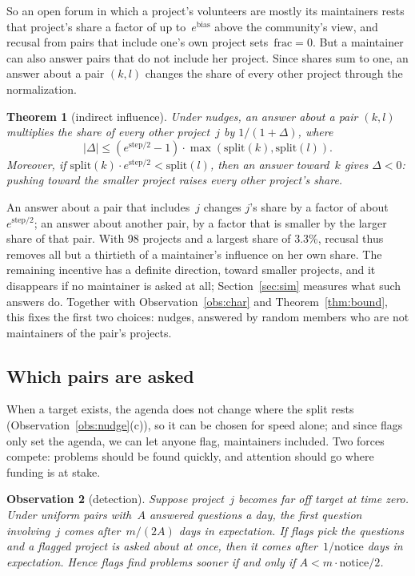 \documentclass[doubleblind]{ecai}
\newtheorem{theorem}{Theorem}
\newtheorem{observation}[theorem]{Observation}
\theoremstyle{remark}
\newcommand{\Split}{\mathrm{split}}
\newcommand{\step}{\mathrm{step}}
\newcommand{\notice}{\mathrm{notice}}
\newcommand{\bias}{\mathrm{bias}}
\newcommand{\frc}{\mathrm{frac}}
\begin{document}
So an open forum in which a project's volunteers are mostly its maintainers rests that project's share a factor of up to~$e^{\bias}$ above the community's view, and recusal from pairs that include one's own project sets~$\frc=0$. But a maintainer can also answer pairs that do not include her project. Since shares sum to one, an answer about a pair $(k,l)$ changes the share of every other project through the normalization.

\begin{theorem}[indirect influence]\label{thm:indirect}
Under nudges, an answer about a pair $(k,l)$ multiplies the share of every other project~$j$ by $1/(1+\Delta)$, where
\[
|\Delta| \le \left(e^{\step/2}-1\right)\cdot\max\left(\Split(k),\Split(l)\right).
\]
Moreover, if $\Split(k)\cdot e^{\step/2} < \Split(l)$, then an answer toward~$k$ gives $\Delta<0$: pushing toward the smaller project raises every other project's share.
\end{theorem}

An answer about a pair that includes~$j$ changes $j$'s share by a factor of about $e^{\step/2}$; an answer about another pair, by a factor that is smaller by the larger share of that pair. With 98 projects and a largest share of 3.3\%, recusal thus removes all but a thirtieth of a maintainer's influence on her own share. The remaining incentive has a definite direction, toward smaller projects, and it disappears if no maintainer is asked at all; Section~\ref{sec:sim} measures what such answers do. Together with Observation~\ref{obs:char} and Theorem~\ref{thm:bound}, this fixes the first two choices: nudges, answered by random members who are not maintainers of the pair's projects.

\subsection{Which pairs are asked}\label{sec:which}

When a target exists, the agenda does not change where the split rests (Observation~\ref{obs:nudge}(c)), so it can be chosen for speed alone; and since flags only set the agenda, we can let anyone flag, maintainers included. Two forces compete: problems should be found quickly, and attention should go where funding is at stake.

\begin{observation}[detection]\label{obs:detect}
Suppose project~$j$ becomes far off target at time zero. Under uniform pairs with~$A$ answered questions a day, the first question involving~$j$ comes after~$m/(2A)$ days in expectation. If flags pick the questions and a flagged project is asked about at once, then it comes after~$1/\notice$ days in expectation. Hence flags find problems sooner if and only if $A < m\cdot\notice/2$.
\end{observation}
\end{document}
